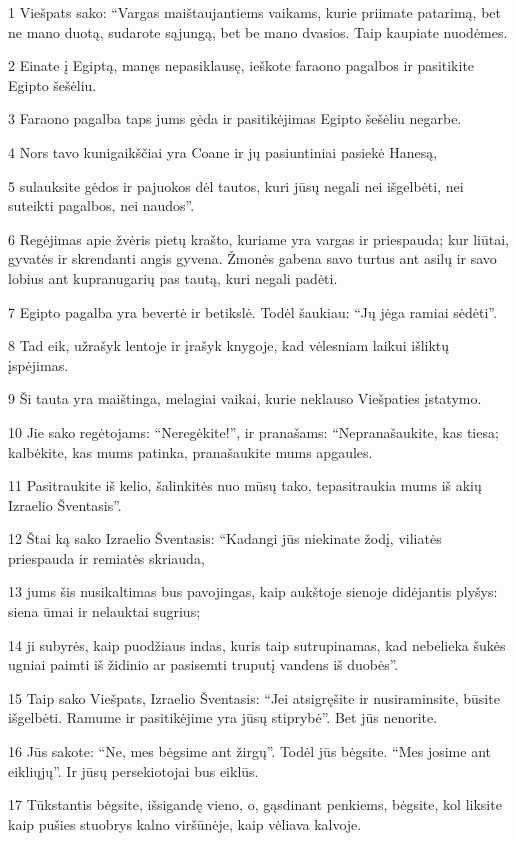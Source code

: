 \par 1 Viešpats sako: “Vargas maištaujantiems vaikams, kurie priimate patarimą, bet ne mano duotą, sudarote sąjungą, bet be mano dvasios. Taip kaupiate nuodėmes. 
\par 2 Einate į Egiptą, manęs nepasiklausę, ieškote faraono pagalbos ir pasitikite Egipto šešėliu. 
\par 3 Faraono pagalba taps jums gėda ir pasitikėjimas Egipto šešėliu­ negarbe. 
\par 4 Nors tavo kunigaikščiai yra Coane ir jų pasiuntiniai pasiekė Hanesą, 
\par 5 sulauksite gėdos ir pajuokos dėl tautos, kuri jūsų negali nei išgelbėti, nei suteikti pagalbos, nei naudos”. 
\par 6 Regėjimas apie žvėris pietų krašto, kuriame yra vargas ir priespauda; kur liūtai, gyvatės ir skrendanti angis gyvena. Žmonės gabena savo turtus ant asilų ir savo lobius ant kupranugarių pas tautą, kuri negali padėti. 
\par 7 Egipto pagalba yra bevertė ir betikslė. Todėl šaukiau: “Jų jėga ramiai sėdėti”. 
\par 8 Tad eik, užrašyk lentoje ir įrašyk knygoje, kad vėlesniam laikui išliktų įspėjimas. 
\par 9 Ši tauta yra maištinga, melagiai vaikai, kurie neklauso Viešpaties įstatymo. 
\par 10 Jie sako regėtojams: “Neregėkite!”, ir pranašams: “Nepranašaukite, kas tiesa; kalbėkite, kas mums patinka, pranašaukite mums apgaules. 
\par 11 Pasitraukite iš kelio, šalinkitės nuo mūsų tako, tepasitraukia mums iš akių Izraelio Šventasis”. 
\par 12 Štai ką sako Izraelio Šventasis: “Kadangi jūs niekinate žodį, viliatės priespauda ir remiatės skriauda, 
\par 13 jums šis nusikaltimas bus pavojingas, kaip aukštoje sienoje didėjantis plyšys: siena ūmai ir nelauktai sugrius; 
\par 14 ji subyrės, kaip puodžiaus indas, kuris taip sutrupinamas, kad nebelieka šukės ugniai paimti iš židinio ar pasisemti truputį vandens iš duobės”. 
\par 15 Taip sako Viešpats, Izraelio Šventasis: “Jei atsigręšite ir nusiraminsite, būsite išgelbėti. Ramume ir pasitikėjime yra jūsų stiprybė”. Bet jūs nenorite. 
\par 16 Jūs sakote: “Ne, mes bėgsime ant žirgų”. Todėl jūs bėgsite. “Mes josime ant eikliųjų”. Ir jūsų persekiotojai bus eiklūs. 
\par 17 Tūkstantis bėgsite, išsigandę vieno, o, gąsdinant penkiems, bėgsite, kol liksite kaip pušies stuobrys kalno viršūnėje, kaip vėliava kalvoje. 
